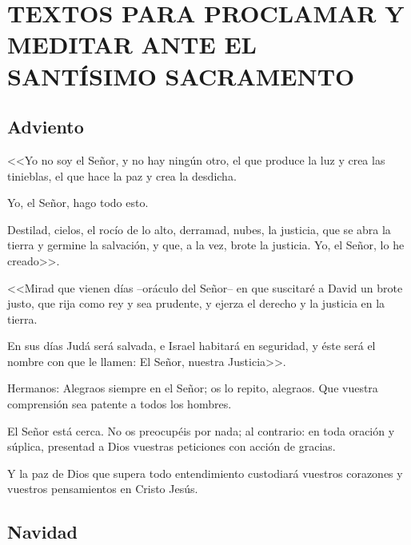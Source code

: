 \chapter{TEXTOS PARA PROCLAMAR Y MEDITAR ANTE EL SANTÍSIMO SACRAMENTO}



\section{Adviento}


<<Yo no soy el Señor, y no hay ningún otro, el que 
produce la luz y crea las tinieblas, el que hace 
la paz y crea la desdicha. 

Yo, el Señor, hago 
todo esto. 

Destilad, cielos, el rocío de lo alto, 
derramad, nubes, la justicia, que se abra la 
tierra y germine la salvación, y que, a la vez, 
brote la justicia. Yo, el Señor, lo he creado>>. 



<<Mirad que vienen días --oráculo del Señor-- en 
que suscitaré a David un brote justo, que rija 
como rey y sea prudente, y ejerza el derecho y 
la justicia en la tierra. 

En sus días Judá será 
salvada, e Israel habitará en seguridad, y éste 
será el nombre con que le llamen: El Señor, 
nuestra Justicia>>. 




Hermanos: Alegraos siempre en el Señor; os lo 
repito, alegraos. Que vuestra comprensión sea 
patente a todos los hombres. 

El Señor está 
cerca. No os preocupéis por nada; al contrario: 
en toda oración y súplica, presentad a Dios 
vuestras peticiones con acción de gracias. 

Y la 
paz de Dios que supera todo entendimiento 
custodiará vuestros corazones y vuestros 
pensamientos en Cristo Jesús. 

\newpage
\section{Navidad}


